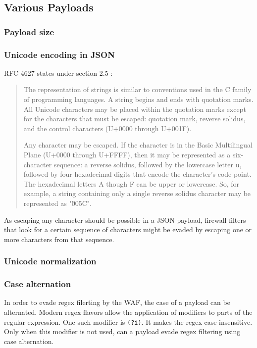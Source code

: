 \subsection{Various Payloads}

\subsubsection{Payload size}

\subsubsection{Unicode encoding in JSON}
RFC 4627  states under section 2.5 :
\begin{quote}
	The representation of strings is similar to conventions used in the C
	family of programming languages.  A string begins and ends with
	quotation marks.  All Unicode characters may be placed within the
	quotation marks except for the characters that must be escaped:
	quotation mark, reverse solidus, and the control characters (U+0000
	through U+001F).

	Any character may be escaped.  If the character is in the Basic
	Multilingual Plane (U+0000 through U+FFFF), then it may be
	represented as a six-character sequence: a reverse solidus, followed
	by the lowercase letter u, followed by four hexadecimal digits that
	encode the character's code point.  The hexadecimal letters A though
	F can be upper or lowercase.  So, for example, a string containing
	only a single reverse solidus character may be represented as
	"\u005C". \cite{rfc4627}
\end{quote}
As escaping any character should be possible in a JSON payload, firewall filters that look for a certain sequence of characters might be evaded by escaping one or more characters from that sequence.


\subsubsection{Unicode normalization}
{\color{red}
\cite{unicode/normalization}
\cite{medium/allypetitt}
}


\subsubsection{Case alternation}
In order to evade regex filerting by the WAF, the case of a payload can be alternated. \cite{medium/allypetitt}
Modern regex flavors allow the application of modifiers to parts of the regular expression.
One such modifier is \verb|(?i)|. It makes the regex case insensitive. \cite{regex/jan} Only when this modifier is not used, can a payload evade regex filtering using case alternation.

